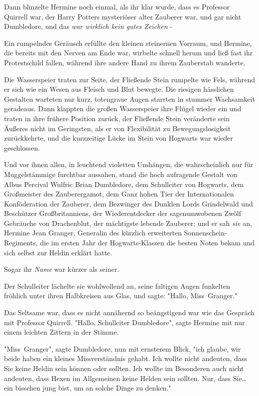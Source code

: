 {Dann blinzelte Hermine noch einmal, als ihr klar wurde, dass es Professor Quirrell war, der Harry Potters mysteriöser alter Zauberer war, und gar nicht Dumbledore, und das \emph{war wirklich kein gutes Zeichen} -

Ein rumpelndes Geräusch erfüllte den kleinen steinernen Vorraum, und Hermine, die bereits mit den Nerven am Ende war, wirbelte schnell herum und ließ fast ihr Protestschild fallen, während ihre andere Hand zu ihrem Zauberstab wanderte.

Die Wasserspeier traten zur Seite, der Fließende Stein rumpelte wie Fels, während er sich wie ein Wesen aus Fleisch und Blut bewegte. Die riesigen hässlichen Gestalten warteten nur kurz, totengraue Augen starrten in stummer Wachsamkeit geradeaus. Dann klappten die großen Wasserspeier ihre Flügel wieder ein und traten in ihre frühere Position zurück, der Fließende Stein veränderte sein Äußeres nicht im Geringsten, als er von Flexibilität zu Bewegungslosigkeit zurückkehrte, und die kurzzeitige Lücke im Stein von Hogwarts war wieder geschlossen.

Und vor ihnen allen, in leuchtend violetten Umhängen, die wahrscheinlich nur für Muggelstämmige furchtbar aussahen, stand die hoch aufragende Gestalt von Albus Percival Wulfric Brian Dumbledore, dem Schulleiter von Hogwarts, dem Großmeister des Zauberergamot, dem Ganz hohen Tier der Internationalen Konföderation der Zauberer, dem Bezwinger des Dunklen Lords Grindelwald und Beschützer Großbritanniens, der Wiederentdecker der sagenumwobenen Zwölf Gebräuche von Drachenblut, der mächtigste lebende Zauberer; und er sah \emph{sie} an, Hermine Jean Granger, Generalin des kürzlich erweiterten Sonnenschein-Regiments, die im ersten Jahr der Hogwarts-Klassen die besten Noten bekam und sich selbst zur Heldin erklärt hatte.

Sogar ihr \emph{Name} war kürzer als seiner.

Der Schulleiter lächelte sie wohlwollend an, seine faltigen Augen funkelten fröhlich unter ihren Halbkreisen aus Glas, und sagte: "Hallo, Miss~Granger."

Das Seltsame war, dass es nicht annähernd so beängstigend war wie das Gespräch mit Professor Quirrell. "Hallo, Schulleiter Dumbledore", sagte Hermine mit nur einem leichten Zittern in der Stimme.

"Miss~Granger", sagte Dumbledore, nun mit ernsterem Blick, "ich glaube, wir beide haben ein kleines Missverständnis gehabt. Ich wollte nicht andeuten, dass Sie keine Heldin sein können oder sollten. Ich wollte im Besonderen auch nicht andeuten, dass Hexen im Allgemeinen keine Helden sein sollten. Nur, dass Sie… ein bisschen jung bist, um an solche Dinge zu denken."

}
